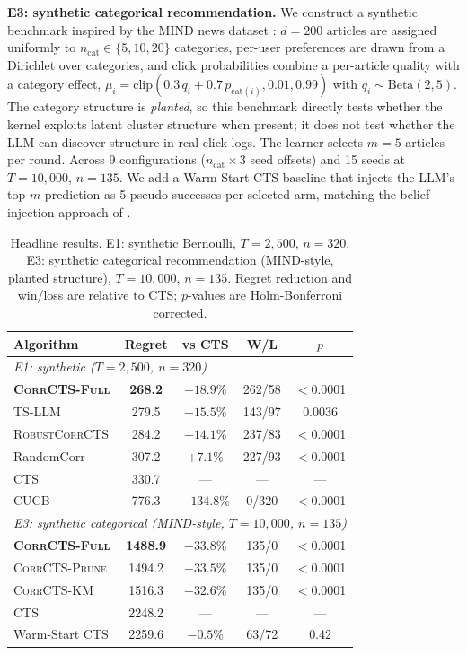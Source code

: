 \documentclass{article}
\theoremstyle{plain}
\theoremstyle{definition}
\theoremstyle{remark}
\newcommand{\CorrFull}{\textsc{CorrCTS-Full}}
\newcommand{\RobustCorr}{\textsc{RobustCorrCTS}}
\newcommand{\EdgePrune}{\textsc{CorrCTS-Prune}}
\newcommand{\KMRefine}{\textsc{CorrCTS-KM}}
\begin{document}
\textbf{E3: synthetic categorical recommendation.}
We construct a synthetic benchmark inspired by the MIND news dataset \citep{wu2020mind}: $d = 200$ articles are assigned uniformly to $n_\mathrm{cat} \in \{5, 10, 20\}$ categories, per-user preferences are drawn from a Dirichlet over categories, and click probabilities combine a per-article quality with a category effect, $\mu_i = \mathrm{clip}(0.3\, q_i + 0.7\, p_{\mathrm{cat}(i)}, 0.01, 0.99)$ with $q_i \sim \mathrm{Beta}(2,5)$.
The category structure is \emph{planted}, so this benchmark directly tests whether the kernel exploits latent cluster structure when present; it does not test whether the LLM can discover structure in real click logs.
The learner selects $m = 5$ articles per round.
Across 9 configurations ($n_\mathrm{cat} \times 3$ seed offsets) and 15 seeds at $T = 10{,}000$, $n = 135$.
We add a Warm-Start CTS baseline that injects the LLM's top-$m$ prediction as 5 pseudo-successes per selected arm, matching the belief-injection approach of \citet{alamdari2024jumpstarting}.

\begin{table}[t]
\caption{Headline results. E1: synthetic Bernoulli, $T{=}2{,}500$, $n{=}320$. E3: synthetic categorical recommendation (MIND-style, planted structure), $T{=}10{,}000$, $n{=}135$. Regret reduction and win/loss are relative to CTS; $p$-values are Holm-Bonferroni corrected.}
\label{tab:headline}
\centering
\small
\begin{tabular}{@{}lcccc@{}}
\toprule
Algorithm & Regret & vs CTS & W/L & $p$ \\
\midrule
\multicolumn{5}{l}{\textit{E1: synthetic ($T{=}2{,}500$, $n{=}320$)}} \\
\textbf{\CorrFull} & \textbf{268.2} & $+18.9\%$ & 262/58 & $<$0.0001 \\
TS-LLM & 279.5 & $+15.5\%$ & 143/97 & 0.0036 \\
\RobustCorr & 284.2 & $+14.1\%$ & 237/83 & $<$0.0001 \\
RandomCorr & 307.2 & $+7.1\%$ & 227/93 & $<$0.0001 \\
CTS & 330.7 & --- & --- & --- \\
CUCB & 776.3 & $-134.8\%$ & 0/320 & $<$0.0001 \\
\midrule
\multicolumn{5}{l}{\textit{E3: synthetic categorical (MIND-style, $T{=}10{,}000$, $n{=}135$)}} \\
\textbf{\CorrFull} & \textbf{1488.9} & $+33.8\%$ & 135/0 & $<$0.0001 \\
\EdgePrune & 1494.2 & $+33.5\%$ & 135/0 & $<$0.0001 \\
\KMRefine & 1516.3 & $+32.6\%$ & 135/0 & $<$0.0001 \\
CTS & 2248.2 & --- & --- & --- \\
Warm-Start CTS & 2259.6 & $-0.5\%$ & 63/72 & 0.42 \\
\bottomrule
\end{tabular}
\end{table}
\end{document}
